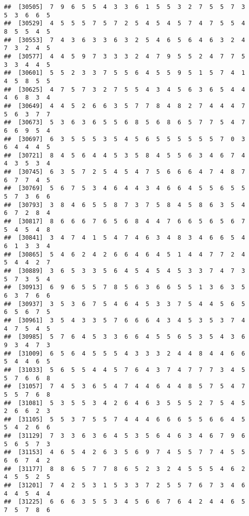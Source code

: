 \documentclass[
]{book}
\begin{document}
\begin{verbatim}
##  [30505]  7  9  6  5  5  4  3  3  6  1  5  5  3  2  7  5  5  7  3  5  3  6  6  5
##  [30529]  4  5  5  5  7  5  7  2  5  4  5  4  5  7  4  7  5  5  4  8  5  5  4  5
##  [30553]  7  4  3  6  3  3  6  3  2  5  4  6  5  6  4  6  3  2  4  7  3  2  4  5
##  [30577]  4  4  5  9  7  3  3  3  2  4  7  9  5  5  2  4  7  7  5  3  3  4  4  5
##  [30601]  5  5  2  3  3  7  5  5  6  4  5  5  9  5  1  5  7  4  1  4  5  8  5  5
##  [30625]  4  7  5  7  3  2  7  5  5  4  3  4  5  6  3  6  5  4  4  4  6  8  3  4
##  [30649]  4  4  5  2  6  6  3  5  7  7  8  4  8  2  7  4  4  4  7  5  6  3  7  7
##  [30673]  5  3  6  3  6  5  5  6  8  5  6  8  6  5  7  7  5  4  7  6  6  9  5  4
##  [30697]  6  3  5  5  5  3  5  4  5  6  5  5  5  5  5  5  7  0  3  6  4  4  4  5
##  [30721]  8  4  5  6  4  4  5  3  5  8  4  5  5  6  3  4  6  7  4  4  3  5  3  4
##  [30745]  6  3  5  7  2  5  4  5  4  7  5  6  6  6  4  7  4  8  7  6  7  7  4  5
##  [30769]  5  6  7  5  3  4  6  4  4  3  4  6  6  4  5  5  6  5  5  5  7  3  6  6
##  [30793]  3  8  4  6  5  5  8  7  3  7  5  8  4  5  8  6  3  5  4  6  7  2  8  4
##  [30817]  8  6  6  6  7  6  5  6  8  4  4  7  6  6  5  6  5  6  7  5  4  5  4  8
##  [30841]  3  4  7  4  1  5  4  7  4  6  3  4  8  3  4  6  6  5  4  6  1  3  3  4
##  [30865]  5  4  6  2  4  2  6  6  4  6  4  5  1  4  4  7  7  2  4  5  4  4  2  7
##  [30889]  3  6  5  3  3  5  6  4  5  4  5  4  5  3  3  7  4  7  3  5  7  3  5  4
##  [30913]  6  9  6  5  5  7  8  5  6  3  6  6  5  5  1  3  6  3  5  6  3  7  6  6
##  [30937]  3  5  3  6  7  5  4  6  4  5  3  3  7  5  4  4  5  6  5  6  5  6  7  5
##  [30961]  3  5  4  3  3  5  7  6  6  6  4  3  4  5  3  5  3  7  4  4  7  5  4  5
##  [30985]  5  7  6  4  5  3  3  6  6  4  5  5  6  5  3  5  4  3  6  9  3  4  7  3
##  [31009]  6  5  6  4  5  5  5  4  3  3  3  2  4  4  8  4  4  6  6  5  4  4  6  5
##  [31033]  5  6  5  5  4  4  5  7  6  4  3  7  4  7  7  7  3  4  5  5  7  6  6  8
##  [31057]  7  4  5  3  6  5  4  7  4  4  6  4  4  8  5  7  5  4  7  5  5  7  6  8
##  [31081]  5  3  5  5  3  4  2  6  4  6  3  5  5  5  2  7  5  4  5  2  6  6  2  3
##  [31105]  5  5  3  7  5  5  7  4  4  4  6  6  6  5  5  6  6  4  5  5  4  2  6  6
##  [31129]  7  3  3  6  3  6  4  5  3  5  6  4  6  3  4  6  7  9  6  5  6  5  7  3
##  [31153]  4  6  5  4  2  6  3  5  6  9  7  4  5  5  7  7  4  5  5  6  6  7  4  2
##  [31177]  8  8  6  5  7  7  8  6  5  2  3  2  4  5  5  5  4  6  2  4  5  5  2  5
##  [31201]  7  4  2  5  3  1  5  3  3  7  2  5  5  7  6  7  3  4  6  4  4  5  4  4
##  [31225]  6  6  6  3  5  5  3  4  5  6  6  7  6  4  2  4  4  6  5  7  5  7  8  6

\end{verbatim}
\end{document}
